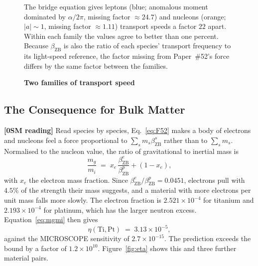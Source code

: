 \documentclass[%
 reprint, amsmath,amssymb, aps, prb, ]{revtex4-2}
\numberwithin{equation}{section}
\newcommand{\betaZB}{\beta_{\text{ZB}}}
\newcommand{\nuZB}{\nu_{\text{ZB}}}
\newcommand{\nuC}{\nu_{\text{C}}}
\begin{document}
\begin{figure}[t!]
\centering
{}
\caption{\textbf{Two families of transport speed}}
\label{fig:species}
\vspace{0.4em}
\begin{minipage}{0.95\columnwidth}
\justifying\small
The bridge equation gives leptons (blue; anomalous moment dominated by $\alpha/2\pi$, missing factor $\approx24.7$) and nucleons (orange; $\lvert a\rvert \sim 1$, missing factor $\approx1.11$) transport speeds a factor $22$ apart. Within each family the values agree to better than one percent. Because $\betaZB$ is also the ratio of each species' transport frequency to its light-speed reference, the factor missing from Paper~\#52's force differs by the same factor between the families.
\end{minipage}
\end{figure}

\subsection{The Consequence for Bulk Matter}
\label{subsec:bulk}

\textbf{[0SM reading]} Read species by species, Eq.~\eqref{eq:F52} makes a body of electrons and nucleons feel a force proportional to $\sum_s m_s\betaZB^{s}$ rather than to $\sum_s m_s$. Normalised to the nucleon value, the ratio of gravitational to inertial mass is
\begin{equation}
\frac{m_g}{m_i} \;=\; x_e\,\frac{\betaZB^{e}}{\betaZB^{p}} + (1 - x_e),
\label{eq:mgmi}
\end{equation}
with $x_e$ the electron mass fraction. Since $\betaZB^{e}/\betaZB^{p} = 0.0451$, electrons pull with $4.5\%$ of the strength their mass suggests, and a material with more electrons per unit mass falls more slowly. The electron fraction is $2.521\times10^{-4}$ for titanium and $2.193\times10^{-4}$ for platinum, which has the larger neutron excess. Equation~\eqref{eq:mgmi} then gives
\begin{equation}
\eta(\mathrm{Ti},\mathrm{Pt}) \;=\; 3.13\times10^{-5},
\label{eq:eta_pred}
\end{equation}
against the MICROSCOPE sensitivity of $2.7\times10^{-15}$. The prediction exceeds the bound by a factor of $1.2\times10^{10}$. Figure~\ref{fig:eta} shows this and three further material pairs.
\end{document}
